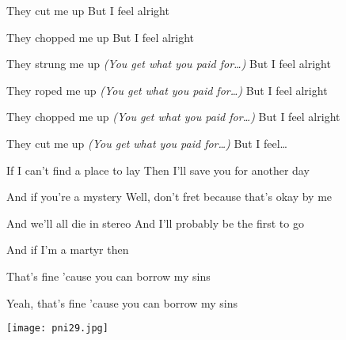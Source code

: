 \pagebreak
\begin{strophe*}
  They cut me up \hfill
  But I feel alright
  
  They chopped me up \hfill
  But I feel alright
  
  They strung me up \hfill
  \emph{(You get what you paid for\dots)} \hfill
  But I feel alright
  
  They roped me up \hfill
  \emph{(You get what you paid for\dots)} \hfill
  But I feel alright
  
  They chopped me up \hfill
  \emph{(You get what you paid for\dots)} \hfill
  But I feel alright
  
  They cut me up \hfill
  \emph{(You get what you paid for\dots)} \hfill
  But I feel\dots{}\null\br\br
\end{strophe*}
\begin{strophe*}
  If I can't find a place to lay\pause{} \hfill
  Then I'll save you for another day\pause{}
  
  And if you're a mystery\pause{} \hfill
  Well, don't fret because that's okay by me\pause{}
  
  And we'll all die in stereo\pause{} \hfill
  And I'll probably be the first to go\pause{}
  
  And if I'm a martyr then\pause{}
  
  That's fine 'cause you can borrow my sins\pause{}
  
  Yeah, that's fine 'cause you can borrow my sins
\end{strophe*}

\vfill
\begin{center}
 \texttt{[image: pni29.jpg]}
\end{center}
\vfill
